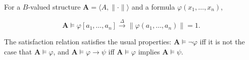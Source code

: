 For a $B$-valued structure $\mathbf{A} = \langle A, \|{\cdot}\| \rangle$ and a formula $\varphi(x_1, \ldots, x_n)$,

$$\mathbf{A} \models \varphi[a_1, \ldots, a_n] \xrightarrow{\Delta} \|\varphi(a_1, \ldots, a_n)\| = 1.$$

The satisfaction relation satisfies the usual properties: $\mathbf{A} \models \neg \varphi$ iff it is not the case that $\mathbf{A} \models \varphi$, and $\mathbf{A} \models \varphi \rightarrow \psi$ iff $\mathbf{A} \models \varphi$ implies $\mathbf{A} \models \psi$.
